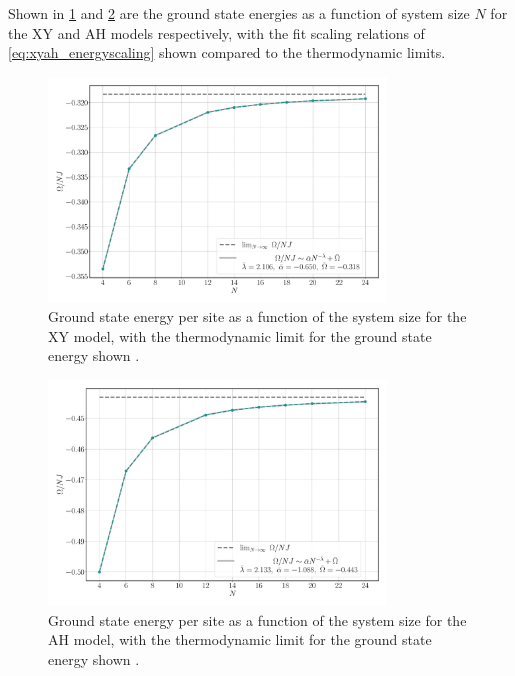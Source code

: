 \documentclass[12pt]{article}{}
\begin{document}
Shown in \cref{fig:xy_energy_N} and \cref{fig:ah_energy_N} are the ground state energies as a function of system size $N$ for the XY and AH models respectively, with the fit scaling relations of \cref{eq:xyah_energyscaling} shown compared to the thermodynamic limits.
\begin{figure}[H]
  \centering
  \includegraphics[width=0.8\textwidth]{figures/xy/energy__N__U.pdf}
  \caption{Ground state energy per site as a function of the system size for the XY model, with the thermodynamic limit for the ground state energy shown \cite{Lieb1961}.}
  \label{fig:xy_energy_N}
\end{figure}
\begin{figure}[H]
  \centering
  \includegraphics[width=0.8\textwidth]{figures/ah/energy__N__U.pdf}
  \caption{Ground state energy per site as a function of the system size for the AH model, with the thermodynamic limit for the ground state energy shown \cite{Lieb1961}.}
  \label{fig:ah_energy_N}
\end{figure}
\end{document}
